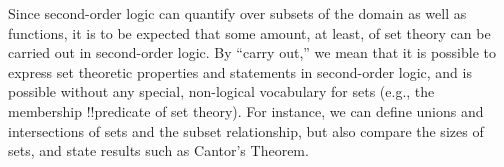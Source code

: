 \documentclass[../../../include/open-logic-section]{subfiles}
\begin{document}


Since second-order logic can quantify over subsets of the domain as
well as functions, it is to be expected that some amount, at least, of
set theory can be carried out in second-order logic. By ``carry out,''
we mean that it is possible to express set theoretic properties and
statements in second-order logic, and is possible without any special,
non-logical vocabulary for sets (e.g., the membership !!{predicate} of
set theory).  For instance, we can define unions and intersections of
sets and the subset relationship, but also compare the sizes of sets,
and state results such as Cantor's Theorem.
\end{document}
